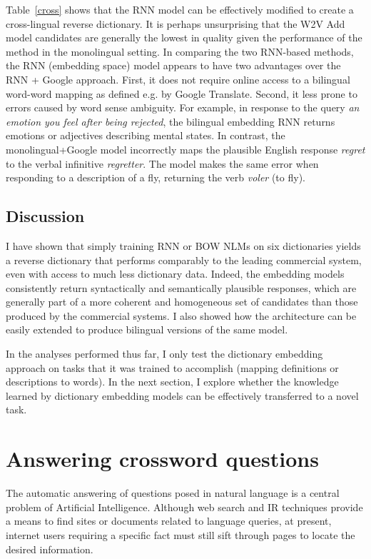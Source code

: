 Table~\ref{cross} shows that the RNN model can be effectively modified to create a cross-lingual reverse dictionary. It is perhaps unsurprising that the W2V Add model candidates are generally the lowest in quality given the performance of the method in the monolingual setting. In comparing the two RNN-based methods, the RNN (embedding space) model appears to have two advantages over the RNN + Google approach. First, it does not require online access to a bilingual word-word mapping as defined e.g. by Google Translate. Second, it less prone to errors caused by word sense ambiguity. For example, in response to the query \emph{an emotion you feel after being rejected}, the bilingual embedding RNN returns emotions or adjectives describing mental states. In contrast, the monolingual+Google model incorrectly maps the plausible English response \emph{regret} to the verbal infinitive \emph{regretter}. The model makes the same error when responding to a description of a fly, returning the verb \emph{voler} (to fly). 


\subsection{Discussion}

I have shown that simply training RNN or BOW NLMs on six dictionaries yields a reverse dictionary that performs comparably to the leading commercial system, even with access to much less dictionary data. Indeed, the embedding models consistently return syntactically and semantically plausible responses, which are generally part of a more coherent and homogeneous set of candidates than those produced by the commercial systems. I also showed how the architecture can be easily extended to produce bilingual versions of the same model. 

In the analyses performed thus far, I only test the dictionary embedding approach on tasks that it was trained to accomplish
 (mapping definitions or descriptions to words). In the next section, I explore whether the knowledge learned by dictionary embedding models can be effectively transferred to a novel task. 

\section{Answering crossword questions}

The automatic answering of questions posed in natural language is a central problem of Artificial Intelligence. Although web search and IR techniques provide a means to find sites or documents related to language queries, at present, internet users requiring a specific fact must still sift through pages to locate the desired information. 

